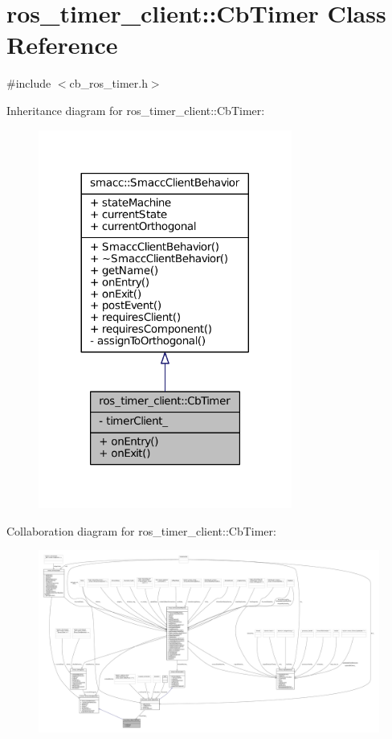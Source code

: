 \hypertarget{classros__timer__client_1_1CbTimer}{}\section{ros\+\_\+timer\+\_\+client\+:\+:Cb\+Timer Class Reference}
\label{classros__timer__client_1_1CbTimer}


{\ttfamily \#include $<$cb\+\_\+ros\+\_\+timer.\+h$>$}



Inheritance diagram for ros\+\_\+timer\+\_\+client\+:\+:Cb\+Timer\+:
\nopagebreak
\begin{figure}[H]
\begin{center}
\leavevmode
\includegraphics[width=236pt]{classros__timer__client_1_1CbTimer__inherit__graph}
\end{center}
\end{figure}


Collaboration diagram for ros\+\_\+timer\+\_\+client\+:\+:Cb\+Timer\+:
\nopagebreak
\begin{figure}[H]
\begin{center}
\leavevmode
\includegraphics[width=350pt]{classros__timer__client_1_1CbTimer__coll__graph}
\end{center}
\end{figure}
